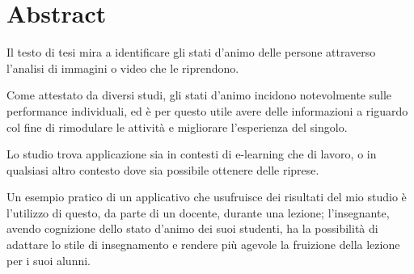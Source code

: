 \chapter*{Abstract}

Il testo di tesi mira a identificare gli stati d’animo delle persone attraverso l’analisi di immagini o video che le riprendono.

Come attestato da diversi studi, gli stati d’animo incidono notevolmente sulle performance individuali, ed è per questo utile avere delle informazioni a riguardo col fine di rimodulare le attività e migliorare l’esperienza del singolo.

Lo studio trova applicazione sia in contesti di e-learning che di lavoro, o in qualsiasi altro contesto dove sia possibile ottenere delle riprese.

Un esempio pratico di un applicativo che usufruisce dei risultati del mio studio è l’utilizzo di questo, da parte di un docente, durante una lezione; l’insegnante, avendo cognizione dello stato d’animo dei suoi studenti, ha la possibilità di adattare lo stile di insegnamento e rendere più agevole la fruizione della lezione per i suoi alunni.